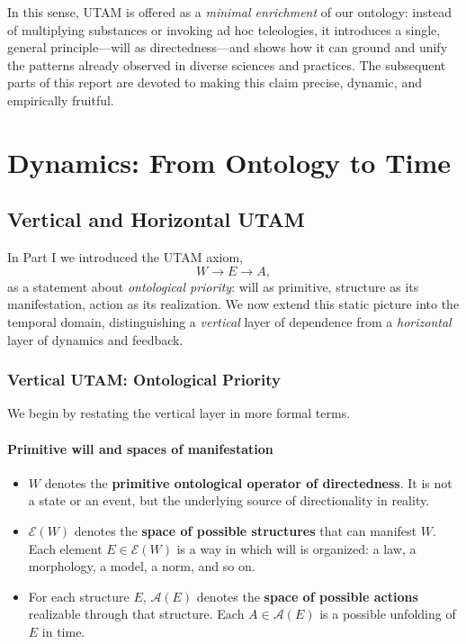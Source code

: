 \documentclass[12pt,a4paper]{report}
\newcommand{\Will}{W}
\newcommand{\Struct}{E}
\newcommand{\Act}{A}
\begin{document}
In this sense, UTAM is offered as a \emph{minimal enrichment} of our ontology: instead of multiplying substances or invoking ad hoc teleologies, it introduces a single, general principle---will as directedness---and shows how it can ground and unify the patterns already observed in diverse sciences and practices. The subsequent parts of this report are devoted to making this claim precise, dynamic, and empirically fruitful.



\part{Dynamics: From Ontology to Time}

\chapter{Vertical and Horizontal UTAM}

In Part I we introduced the UTAM axiom,
\[
    \Will \to \Struct \to \Act,
\]
as a statement about \emph{ontological priority}: will as primitive, structure as its manifestation, action as its realization. We now extend this static picture into the temporal domain, distinguishing a \emph{vertical} layer of dependence from a \emph{horizontal} layer of dynamics and feedback.

\section{Vertical UTAM: Ontological Priority}

We begin by restating the vertical layer in more formal terms.

\subsection*{Primitive will and spaces of manifestation}

\begin{itemize}[leftmargin=2em]
    \item \(\Will\) denotes the \textbf{primitive ontological operator of directedness}. It is not a state or an event, but the underlying source of directionality in reality.
    \item \(\mathcal{E}(\Will)\) denotes the \textbf{space of possible structures} that can manifest \(\Will\). Each element \(E \in \mathcal{E}(\Will)\) is a way in which will is organized: a law, a morphology, a model, a norm, and so on.
    \item For each structure \(E\), \(\mathcal{A}(E)\) denotes the \textbf{space of possible actions} realizable through that structure. Each \(A \in \mathcal{A}(E)\) is a possible unfolding of \(E\) in time.
\end{itemize}
\end{document}

